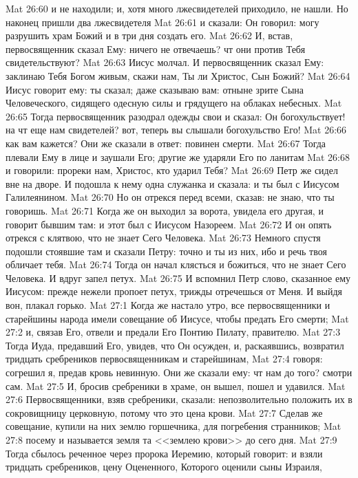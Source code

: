 \vs Mat 26:60 и не находили; и, хотя много лжесвидетелей приходило, не нашли. Но наконец пришли два лжесвидетеля
\vs Mat 26:61 и сказали: Он говорил: могу разрушить храм Божий и в три дня создать его.
\vs Mat 26:62 И, встав, первосвященник сказал Ему:  ничего не отвечаешь? чт они против Тебя свидетельствуют?
\vs Mat 26:63 Иисус молчал. И первосвященник сказал Ему: заклинаю Тебя Богом живым, скажи нам, Ты ли Христос, Сын Божий?
\vs Mat 26:64 Иисус говорит ему: ты сказал; даже сказываю вам: отныне зрите Сына Человеческого, сидящего одесную силы и грядущего на облаках небесных.
\vs Mat 26:65 Тогда первосвященник разодрал одежды свои и сказал: Он богохульствует! на чт еще нам свидетелей? вот, теперь вы слышали богохульство Его!
\vs Mat 26:66 как вам кажется? Они же сказали в ответ: повинен смерти.
\vs Mat 26:67 Тогда плевали Ему в лице и заушали Его; другие же ударяли Его по ланитам
\vs Mat 26:68 и говорили: прореки нам, Христос, кто ударил Тебя?
\rsbpar\vs Mat 26:69 Петр же сидел вне на дворе. И подошла к нему одна служанка и сказала: и ты был с Иисусом Галилеянином.
\vs Mat 26:70 Но он отрекся перед всеми, сказав: не знаю, что ты говоришь.
\vs Mat 26:71 Когда же он выходил за ворота, увидела его другая, и говорит бывшим там: и этот был с Иисусом Назореем.
\vs Mat 26:72 И он опять отрекся с клятвою, что не знает Сего Человека.
\vs Mat 26:73 Немного спустя подошли стоявшие там и сказали Петру: точно и ты из них, ибо и речь твоя обличает тебя.
\vs Mat 26:74 Тогда он начал клясться и божиться, что не знает Сего Человека. И вдруг запел петух.
\vs Mat 26:75 И вспомнил Петр слово, сказанное ему Иисусом: прежде нежели пропоет петух, трижды отречешься от Меня. И выйдя вон, плакал горько.
\vs Mat 27:1 Когда же настало утро, все первосвященники и старейшины народа имели совещание об Иисусе, чтобы предать Его смерти;
\vs Mat 27:2 и, связав Его, отвели и предали Его Понтию Пилату, правителю.
\rsbpar\vs Mat 27:3 Тогда Иуда, предавший Его, увидев, что Он осужден, и, раскаявшись, возвратил тридцать сребреников первосвященникам и старейшинам,
\vs Mat 27:4 говоря: согрешил я, предав кровь невинную. Они же сказали ему: чт нам до того? смотри сам.
\vs Mat 27:5 И, бросив сребреники в храме, он вышел, пошел и удавился.
\vs Mat 27:6 Первосвященники, взяв сребреники, сказали: непозволительно положить их в сокровищницу церковную, потому что это цена крови.
\vs Mat 27:7 Сделав же совещание, купили на них землю горшечника, для погребения странников;
\vs Mat 27:8 посему и называется земля та <<землею крови>> до сего дня.
\vs Mat 27:9 Тогда сбылось реченное через пророка Иеремию, который говорит: и взяли тридцать сребреников, цену Оцененного, Которого оценили сыны Израиля,
